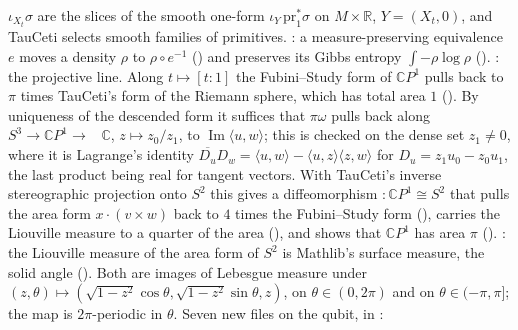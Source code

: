 \documentclass[11pt]{article}
\begin{document}
\begin{itemize}
  $\iota_{X_t}\sigma$ are the slices of the smooth one-form $\iota_Y\,\mathrm{pr}_1^*\sigma$ on
  $M \times \mathbb R$, $Y = (X_t, 0)$, and TauCeti selects smooth families of primitives.\newline
  : a measure-preserving
  equivalence $e$ moves a density $\rho$ to $\rho \circ e^{-1}$
  () and preserves its Gibbs entropy $\int -\rho\log\rho$
  ().\newline
  : the projective
  line. Along $t \mapsto [t : 1]$ the Fubini--Study form of $\mathbb CP^1$ pulls back to $\pi$
  times TauCeti's form of the Riemann sphere, which has total area $1$
  (). By uniqueness of the
  descended form it suffices that $\pi\omega$ pulls back along $S^3 \to \mathbb CP^1 \to$
  ~$\mathbb C$, $z \mapsto z_0/z_1$, to $\operatorname{Im}\langle u, w\rangle$; this is
  checked on the dense set $z_1 \ne 0$, where it is Lagrange's identity
  $\overline{D_u} D_w = \langle u, w\rangle - \langle u, z\rangle\langle z, w\rangle$ for
  $D_u = z_1 u_0 - z_0 u_1$, the last product being real for tangent vectors. With TauCeti's
  inverse stereographic projection onto $S^2$ this gives a diffeomorphism
   $: \mathbb CP^1 \cong S^2$ that pulls the area form
  $x \cdot (v \times w)$ back to $4$ times the Fubini--Study form
  (), carries the Liouville
  measure to a quarter of the area (),
  and shows that $\mathbb CP^1$ has area $\pi$ ().\newline
  : the Liouville measure of the area
  form of $S^2$ is Mathlib's surface measure, the solid angle
  (). Both are images of Lebesgue
  measure under $(z, \theta) \mapsto (\sqrt{1 - z^2}\cos\theta, \sqrt{1 - z^2}\sin\theta, z)$, on
  $\theta \in (0, 2\pi)$ and on $\theta \in (-\pi, \pi]$; the map is $2\pi$-periodic in
  $\theta$.\newline
  Seven new  files on the qubit, in :\newline

\end{itemize}
\end{document}
